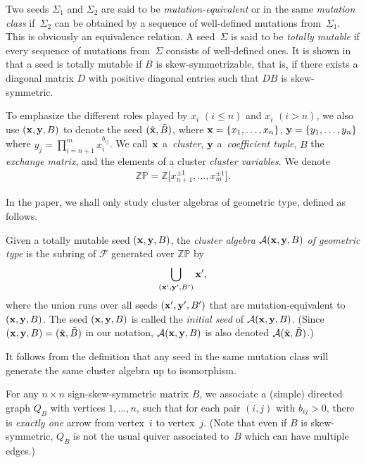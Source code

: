 \documentclass[pdftex]{sigma}
\numberwithin{equation}{section}
\begin{document}
Two seeds $\Sigma_1$ and $\Sigma_2$ are said to be \emph{mutation-equivalent} or in the same \emph{mutation class} if~$\Sigma_2$ can be obtained by a sequence of well-def\/ined mutations from~$\Sigma_1$. This is obviously an equivalence relation. A seed~$\Sigma$ is said to be \emph{totally mutable}  if every sequence of mutations from~$\Sigma$ consists of well-def\/ined ones. It is shown in \cite[Proposition~4.5]{FZ1} that a seed is totally mutable if $B$ is skew-symmetrizable, that is, if there exists a diagonal matrix $D$ with positive diagonal entries such that $DB$ is skew-symmetric.


To emphasize the dif\/ferent roles played by $x_i$ $(i\le n)$ and $x_i$ $(i>n)$, we also use $({\bf x},{\bf y},B)$ to denote the seed $(\tilde{\bf x}, \tilde{B})$, where ${\bf x}=\{x_1,\dots,x_n\}$, ${\bf y}=\{y_1,\dots,y_n\}$ where $y_j=\prod\limits_{i=n+1}^mx_i^{b_{ij}}$. We call~${\bf x}$ a~\emph{cluster}, ${\bf y}$ a~\emph{coefficient tuple}, $B$ the \emph{exchange matrix}, and the elements of a cluster \emph{cluster variables}. We denote
\begin{gather*}
\mathbb{ZP}=\mathbb{Z}\big[x_{n+1}^{\pm1},\dots,x_m^{\pm1}\big].
\end{gather*}

In the paper, we shall only study cluster algebras of geometric type, def\/ined as follows.

\begin{Definition}
Given a totally mutable seed $({\bf x}, {\bf y},B)$, the \emph{cluster algebra} $\mathcal{A}({\bf x},{\bf y},B)$ \emph{of geometric type} is the subring of $\mathcal{F}$ generated over $\mathbb{ZP}$ by
\begin{gather*}
\bigcup_{({\bf x}',{\bf y}',B')} {\bf x}',
 \end{gather*}
 where the union runs over all seeds $({\bf x}', {\bf y}',B')$ that are mutation-equivalent to $({\bf x},{\bf y},B)$. The seed $({\bf x},{\bf y},B)$ is called the \emph{initial seed} of $\mathcal{A}({\bf x},{\bf y},B)$. (Since $({\bf x},{\bf y},B)=(\tilde{\bf x},\tilde{B})$ in our notation, $\mathcal{A}({\bf x},{\bf y},B)$ is also denoted $\mathcal{A}(\tilde{\bf x},\tilde{B})$.)
\end{Definition}

It follows from the def\/inition that any seed in the same mutation class will generate the same cluster algebra up to isomorphism.

 For any $n \times n$ sign-skew-symmetric matrix $B$, we associate a (simple) directed graph $Q_B$ with vertices $1,\ldots,n$, such that for each pair $(i,j)$ with $b_{ij}>0$, there is  \emph{exactly one} arrow from vertex~$i$ to vertex~$j$.
(Note that even if $B$ is skew-symmetric, $Q_B$ is not the usual quiver associated to~$B$ which can have multiple edges.)
\end{document}
